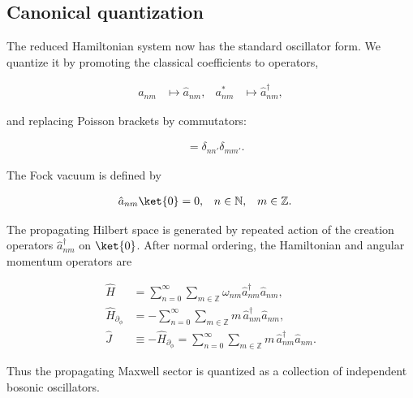 \subsection{Canonical quantization}\label{subsec:canonical-quantization}

The reduced Hamiltonian system now has the standard oscillator form. We quantize it by promoting the classical coefficients to operators,

\begin{align}
a_{nm}&\mapsto\hat{a}_{nm}, &
a_{nm}^{*}&\mapsto\hat{a}_{nm}^{\dagger},
\end{align}

and replacing Poisson brackets by commutators:

\begin{align}
[\hat{a}_{nm},\hat{a}_{n'm'}^{\dagger}]&=\delta_{nn'}\delta_{mm'}.
\end{align}

The Fock vacuum is defined by

\begin{align}
\hat{a}_{nm}\ket{0}&=0, &
n&\in\mathbb{N}, &
m&\in\mathbb{Z}.
\end{align}

The propagating Hilbert space is generated by repeated action of the creation operators $\hat{a}_{nm}^{\dagger}$ on $\ket{0}$. After normal ordering, the Hamiltonian and angular momentum operators are

\begin{align}
\hat{H}&=\sum_{n=0}^{\infty}\sum_{m\in\mathbb{Z}}\omega_{nm}\hat{a}_{nm}^{\dagger}\hat{a}_{nm}, \\
\hat{H}_{\partial_{\phi}}&=-\sum_{n=0}^{\infty}\sum_{m\in\mathbb{Z}}m\,\hat{a}_{nm}^{\dagger}\hat{a}_{nm}, \\
\hat{J}&\equiv-\hat{H}_{\partial_{\phi}}=\sum_{n=0}^{\infty}\sum_{m\in\mathbb{Z}}m\,\hat{a}_{nm}^{\dagger}\hat{a}_{nm}.
\end{align}

Thus the propagating Maxwell sector is quantized as a collection of independent bosonic oscillators.
